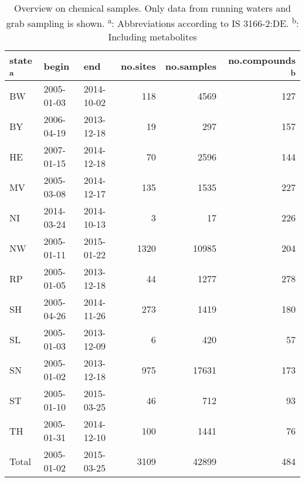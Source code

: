 \begin{table}[ht]
\centering
\caption{Overview on chemical samples. Only data from running waters and grab
sampling is shown. \textsuperscript{a}: Abbreviations according to IS 3166-2:DE. \textsuperscript{b}: Including metabolites} 
\label{tab:phch_overview}
\begin{tabular}{lllrrr}
  \toprule
state \textsuperscript{a} & begin & end & no.sites & no.samples & no.compounds \textsuperscript{b} \\ 
  \midrule
BW & 2005-01-03 & 2014-10-02 & 118 & 4569 & 127 \\ 
  BY & 2006-04-19 & 2013-12-18 & 19 & 297 & 157 \\ 
  HE & 2007-01-15 & 2014-12-18 & 70 & 2596 & 144 \\ 
  MV & 2005-03-08 & 2014-12-17 & 135 & 1535 & 227 \\ 
  NI & 2014-03-24 & 2014-10-13 & 3 & 17 & 226 \\ 
  NW & 2005-01-11 & 2015-01-22 & 1320 & 10985 & 204 \\ 
  RP & 2005-01-05 & 2013-12-18 & 44 & 1277 & 278 \\ 
  SH & 2005-04-26 & 2014-11-26 & 273 & 1419 & 180 \\ 
  SL & 2005-01-03 & 2013-12-09 & 6 & 420 & 57 \\ 
  SN & 2005-01-02 & 2013-12-18 & 975 & 17631 & 173 \\ 
  ST & 2005-01-10 & 2015-03-25 & 46 & 712 & 93 \\ 
  TH & 2005-01-31 & 2014-12-10 & 100 & 1441 & 76 \\ 
   \midrule
Total & 2005-01-02 & 2015-03-25 & 3109 & 42899 & 484 \\ 
   \bottomrule
\end{tabular}
\end{table}
